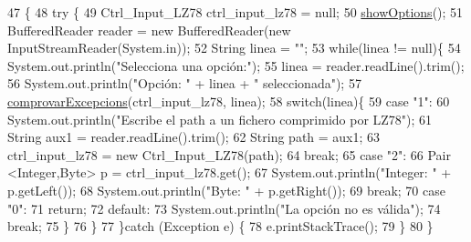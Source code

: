 \begin{DoxyCode}
47                                            \{
48     \textcolor{keywordflow}{try} \{
49         Ctrl\_Input\_LZ78 ctrl\_input\_lz78 = null;
50         \hyperlink{classpersistencia_1_1input_1_1Driver____Ctrl__Input__LZ78_af3c2d5d864dec2d98d3d57c474f9c2b4}{showOptions}();
51         BufferedReader reader = \textcolor{keyword}{new} BufferedReader(\textcolor{keyword}{new} InputStreamReader(System.in));
52         String linea = \textcolor{stringliteral}{""};
53         \textcolor{keywordflow}{while}(linea != null)\{
54             System.out.println(\textcolor{stringliteral}{"Selecciona una opción:"});
55             linea = reader.readLine().trim();
56             System.out.println(\textcolor{stringliteral}{"Opción: "} + linea + \textcolor{stringliteral}{" seleccionada"});
57             \hyperlink{classpersistencia_1_1input_1_1Driver____Ctrl__Input__LZ78_a285493e74dff1f6b2520f010f75b850c}{comprovarExcepcions}(ctrl\_input\_lz78, linea);
58             \textcolor{keywordflow}{switch}(linea)\{
59                 \textcolor{keywordflow}{case} \textcolor{stringliteral}{"1"}:
60                     System.out.println(\textcolor{stringliteral}{"Escribe el path a un fichero comprimido por LZ78"});
61                     String aux1 = reader.readLine().trim();
62                     String path = aux1;
63                     ctrl\_input\_lz78 = \textcolor{keyword}{new} Ctrl\_Input\_LZ78(path);
64                 \textcolor{keywordflow}{break};
65                 \textcolor{keywordflow}{case} \textcolor{stringliteral}{"2"}:
66                     Pair <Integer,Byte> p = ctrl\_input\_lz78.get();
67                     System.out.println(\textcolor{stringliteral}{"Integer: "} + p.getLeft());
68                     System.out.println(\textcolor{stringliteral}{"Byte: "} + p.getRight());
69                 \textcolor{keywordflow}{break};
70                 \textcolor{keywordflow}{case} \textcolor{stringliteral}{"0"}:
71                     \textcolor{keywordflow}{return};
72                 \textcolor{keywordflow}{default}:
73                     System.out.println(\textcolor{stringliteral}{"La opción no es válida"});
74                 \textcolor{keywordflow}{break};
75             \}
76         \}
77     \}\textcolor{keywordflow}{catch} (Exception e) \{
78         e.printStackTrace();
79     \}
80     \}
\end{DoxyCode}
\mbox{\label{classpersistencia_1_1input_1_1Driver____Ctrl__Input__LZ78_af3c2d5d864dec2d98d3d57c474f9c2b4}} 
